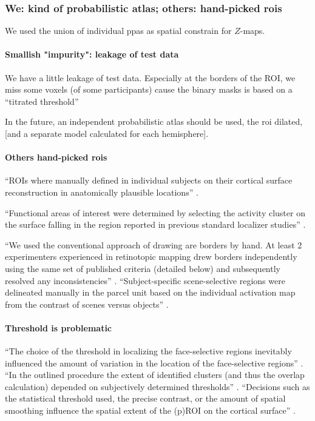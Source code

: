 \subsubsection{We: kind of probabilistic atlas; others: hand-picked \acp{roi}}

%
We used the union of individual \acp{ppa} as spatial constrain for $Z$-maps.

\paragraph{Smallish "impurity": leakage of test data}


%
We have a little leakage of test data.
%
Especially at the borders of the ROI, we miss some voxels (of some participants)
cause the binary masks is based on a ``titrated threshold''
\citep{sengupta2016extension}

%
In the future, an independent probabilistic atlas should be used, the \ac{roi}
dilated, [and a separate model calculated for each hemisphere].


\paragraph{Others hand-picked \acp{roi}}
%
``ROIs where manually defined in individual subjects on their cortical surface
reconstruction in anatomically plausible locations''
\citep{rosenke2021probabilistic}.

%
``Functional areas of interest were determined by selecting the activity cluster
on the surface falling in the region reported in previous standard localizer
studies'' \citep{frost2012measuring}.

%
``We used the conventional approach of drawing are borders by hand.
%
At least 2 experimenters experienced in retinotopic mapping drew borders
independently using the same set of published criteria (detailed below) and
subsequently resolved any inconsistencies'' \citep{wang2015probabilistic}.
%
``Subject-specific scene-selective regions were delineated manually in the
parcel unit based on the individual activation map from the contrast of scenes
versus objects'' \citep{zhen2017quantifying}.

\paragraph{Threshold is problematic}
%
``The choice of the threshold in localizing the face-selective regions
inevitably influenced the amount of variation in the location of the
face-selective regions'' \citep{zhen2015quantifying}.
%
``In the outlined procedure the extent of identified clusters (and thus the
overlap calculation) depended on subjectively determined thresholds''
\citep{frost2012measuring}.
%
``Decisions such as the statistical threshold used, the precise contrast, or the
amount of spatial smoothing influence the spatial extent of the (p)ROI on the
cortical surface'' \citep{weiner2018defining}.



